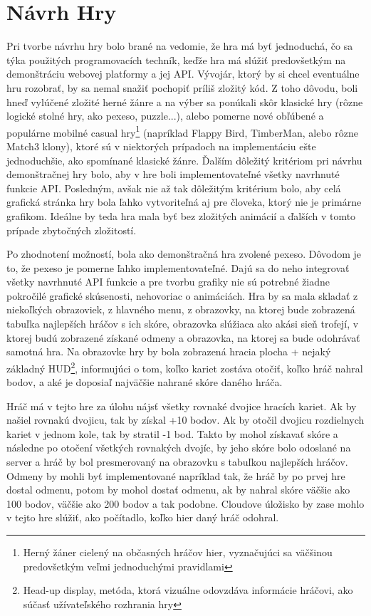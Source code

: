 \section{Návrh Hry}
Pri tvorbe návrhu hry bolo brané na vedomie, že hra má byť jednoduchá, čo sa týka použitých programovacích techník, keďže hra má slúžiť predovšetkým na demonštráciu webovej platformy a jej API. Vývojár, ktorý by si chcel eventuálne hru rozobrať, by sa nemal snažiť pochopiť príliš zložitý kód. Z toho dôvodu, boli hneď vylúčené zložité herné žánre a na výber sa ponúkali skôr klasické hry (rôzne logické stolné hry, ako pexeso, puzzle...), alebo pomerne nové obľúbené a populárne mobilné casual hry\footnote{Herný žáner cielený na občasných hráčov hier, vyznačujúci sa väčšinou predovšetkým veľmi jednoduchými pravidlami} (napríklad Flappy Bird, TimberMan, alebo rôzne Match3 klony), ktoré sú v niektorých prípadoch na implementáciu ešte jednoduchšie, ako spomínané klasické žánre. Ďalším dôležitý kritériom pri návrhu demonštračnej hry bolo, aby v hre boli implementovateľné všetky navrhnuté funkcie API. Posledným, avšak nie až tak dôležitým kritérium bolo, aby celá grafická stránka hry bola ľahko vytvoriteľná aj pre človeka, ktorý nie je primárne grafikom. Ideálne by teda hra mala byť bez zložitých animácií a ďalších v tomto prípade zbytočných zložitostí.  

Po zhodnotení možností, bola ako demonštračná hra zvolené pexeso. Dôvodom je to, že pexeso je pomerne ľahko implementovateľné. Dajú sa do neho integrovať všetky navrhnuté API funkcie a pre tvorbu grafiky nie sú potrebné žiadne pokročilé grafické skúsenosti, nehovoriac o animáciách. Hra by sa mala skladať z niekoľkých obrazoviek, z hlavného menu, z obrazovky, na ktorej bude zobrazená tabuľka najlepších hráčov s ich skóre, obrazovka slúžiaca ako akási sieň trofejí, v ktorej budú zobrazené získané odmeny a obrazovka, na ktorej sa bude odohrávať samotná hra. Na obrazovke hry by bola zobrazená hracia plocha + nejaký základný HUD\footnote{Head-up display, metóda, ktorá vizuálne odovzdáva informácie hráčovi, ako súčasť užívateľského rozhrania hry}, informujúci o tom, koľko kariet zostáva otočiť, koľko hráč nahral bodov, a aké je doposiaľ najväčšie nahrané skóre daného hráča.

Hráč má v tejto hre za úlohu nájsť všetky rovnaké dvojice hracích kariet. Ak by našiel rovnakú dvojicu, tak by získal +10 bodov. Ak by otočil dvojicu rozdielnych kariet v jednom kole, tak by stratil -1 bod. Takto by mohol získavať skóre a následne po otočení všetkých rovnakých dvojíc, by jeho skóre bolo odoslané na server a hráč by bol presmerovaný na obrazovku s tabuľkou najlepších hráčov. Odmeny by mohli byť implementované napríklad tak, že hráč by po prvej hre dostal odmenu, potom by mohol dostať odmenu, ak by nahral skóre väčšie ako 100 bodov, väčšie ako 200 bodov a tak podobne. Cloudove úložisko by zase mohlo v tejto hre slúžiť, ako počítadlo, koľko hier daný hráč odohral. 

